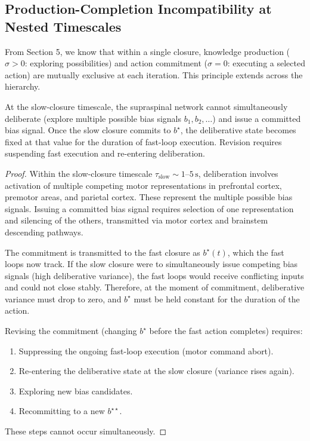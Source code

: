 \subsection{Production-Completion Incompatibility at Nested Timescales}

From Section 5, we know that within a single closure, knowledge production ($\sigma > 0$: exploring possibilities) and action commitment ($\sigma = 0$: executing a selected action) are mutually exclusive at each iteration. This principle extends across the hierarchy.

\begin{theorem}
\label{thm:hierarchical-incompatibility}
At the slow-closure timescale, the supraspinal network cannot simultaneously deliberate (explore multiple possible bias signals $b_1, b_2, \ldots$) and issue a committed bias signal. Once the slow closure commits to $b^{\star}$, the deliberative state becomes fixed at that value for the duration of fast-loop execution. Revision requires suspending fast execution and re-entering deliberation.
\end{theorem}

\begin{proof}
Within the slow-closure timescale $\tau_{\text{slow}} \sim 1\text{--}5\,\text{s}$, deliberation involves activation of multiple competing motor representations in prefrontal cortex, premotor areas, and parietal cortex. These represent the multiple possible bias signals. Issuing a committed bias signal requires selection of one representation and silencing of the others, transmitted via motor cortex and brainstem descending pathways.

The commitment is transmitted to the fast closure as $b^{\star}(t)$, which the fast loops now track. If the slow closure were to simultaneously issue competing bias signals (high deliberative variance), the fast loops would receive conflicting inputs and could not close stably. Therefore, at the moment of commitment, deliberative variance must drop to zero, and $b^{\star}$ must be held constant for the duration of the action.

Revising the commitment (changing $b^{\star}$ before the fast action completes) requires:
\begin{enumerate}
    \item Suppressing the ongoing fast-loop execution (motor command abort).
    \item Re-entering the deliberative state at the slow closure (variance rises again).
    \item Exploring new bias candidates.
    \item Recommitting to a new $b^{\star\star}$.
\end{enumerate}
These steps cannot occur simultaneously.
\end{proof}

